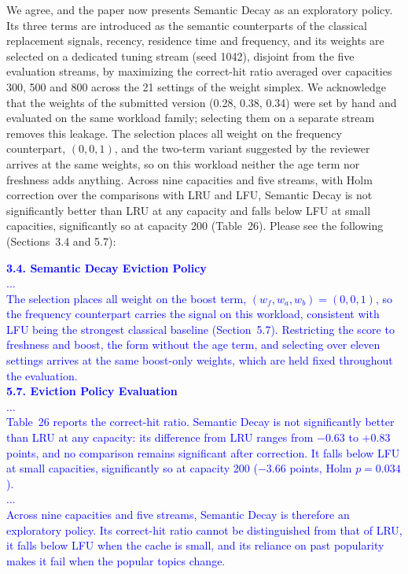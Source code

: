 \documentclass[11pt]{article}
\begin{document}
\begin{enumerate}[leftmargin=*, itemsep=1.2em]
We agree, and the paper now presents Semantic Decay as an exploratory policy. Its three terms are introduced as the semantic counterparts of the classical replacement signals, recency, residence time and frequency, and its weights are selected on a dedicated tuning stream (seed 1042), disjoint from the five evaluation streams, by maximizing the correct-hit ratio averaged over capacities 300, 500 and 800 across the 21 settings of the weight simplex. We acknowledge that the weights of the submitted version (0.28, 0.38, 0.34) were set by hand and evaluated on the same workload family; selecting them on a separate stream removes this leakage. The selection places all weight on the frequency counterpart, $(0,0,1)$, and the two-term variant suggested by the reviewer arrives at the same weights, so on this workload neither the age term nor freshness adds anything. Across nine capacities and five streams, with Holm correction over the comparisons with LRU and LFU, Semantic Decay is not significantly better than LRU at any capacity and falls below LFU at small capacities, significantly so at capacity 200 (Table~26). Please see the following (Sections~3.4 and 5.7):

\textcolor{blue}{\textbf{3.4. Semantic Decay Eviction Policy}\\
...\\
The selection places all weight on the boost term, $(w_f,w_a,w_b)=(0,0,1)$, so the frequency counterpart carries the signal on this workload, consistent with LFU being the strongest classical baseline (Section~5.7). Restricting the score to freshness and boost, the form without the age term, and selecting over eleven settings arrives at the same boost-only weights, which are held fixed throughout the evaluation.\\
\textbf{5.7. Eviction Policy Evaluation}\\
...\\
Table~26 reports the correct-hit ratio. Semantic Decay is not significantly better than LRU at any capacity: its difference from LRU ranges from $-0.63$ to $+0.83$ points, and no comparison remains significant after correction. It falls below LFU at small capacities, significantly so at capacity 200 ($-3.66$ points, Holm $p=0.034$).\\
...\\
Across nine capacities and five streams, Semantic Decay is therefore an exploratory policy. Its correct-hit ratio cannot be distinguished from that of LRU, it falls below LFU when the cache is small, and its reliance on past popularity makes it fail when the popular topics change.}


\end{enumerate}
\end{document}

